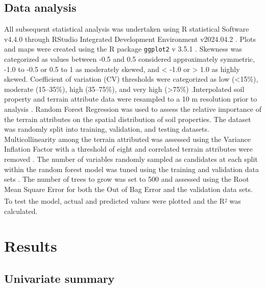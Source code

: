 \documentclass[
  number]{elsarticle}
\begin{document}
\subsection{Data analysis}\label{data-analysis}

All subsequent statistical analysis was undertaken using R statistical
Software v4.4.0 \citep{rcoreteam2024} through RStudio Integrated
Development Environment v2024.04.2 \citep{rstudio2024}. Plots and maps
were created using the R package \texttt{ggplot2} v 3.5.1
\citep{wickham2016}. Skewness was categorized as values between -0.5 and
0.5 considered approximately symmetric, -1.0 to -0.5 or 0.5 to 1 as
moderately skewed, and \textless{} -1.0 or \textgreater{} 1.0 as highly
skewed. Coefficient of variation (CV) thresholds were categorized as low
(\textless15\%), moderate (15--35\%), high (35--75\%), and very high
(\textgreater75\%) .Interpolated soil property and terrain attribute
data were resampled to a 10 m resolution prior to analysis
\citep[\texttt{terra} v1.8.29][]{hijmans2024}. Random Forest Regression
\citep[\texttt{randomForest} v4.7.1.2][]{liaw2002} was used to assess
the relative importance of the terrain attributes on the spatial
distribution of soil properties. The dataset was randomly split into
training, validation, and testing datasets. Multicollinearity among the
terrain attributed was assessed using the Variance Inflation Factor with
a threshold of eight and correlated terrain attributes were removed
\citep[\texttt{usdm} v2.1.7][]{Naimi2014}. The number of variables
randomly sampled as candidates at each split within the random forest
model was tuned using the training and validation data sets
\citep[\texttt{caret} v7.0.1][]{kuhn2008}. The number of trees to grow
was set to 500 and assessed using the Root Mean Square Error for both
the Out of Bag Error and the validation data sets. To test the model,
actual and predicted values were plotted and the
R\textsuperscript{\textsubscript{2}} was calculated.

\section{Results}\label{results}

\subsection{Univariate summary}\label{univariate-summary}
\end{document}
